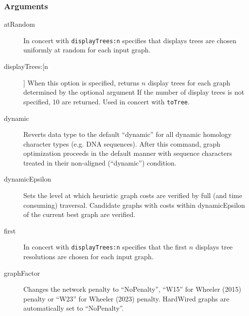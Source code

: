 	\subsubsection{Arguments}
		\begin{description}
			\item[atRandom] In concert with \texttt{displayTrees:n} specifies that displays trees are chosen 
			uniformly at random for each input graph.
			
			
			\item[displayTrees:[n]] When this option is specified, returns $n$ display trees for each graph 
			determined by the optional argument If the number of display trees is not 
			specified, 10 are returned. Used in concert with \texttt{toTree}.
			
			\item[dynamic] Reverts data type to the default ``dynamic'' for all dynamic homology 
			\citep{Wheeler2001} character types (e.g. DNA sequences). After this command, 
			graph optimization proceeds in the default manner with sequence characters treated 
			in their non-aligned (``dynamic'') condition.
			
			\item[dynamicEpsilon] Sets the level at which heuristic graph costs are verified by full (and time consuming) traversal.  
			Candidate graphs with costs within dynamicEpsilon of the current best graph are verified.
			
			\item[first] In concert with \texttt{displayTrees:n} specifies that the first $n$ displays tree 
			resolutions are chosen for each input graph.
			
			\item[graphFactor] Changes the network penalty to ``NoPenalty'', ``W15'' for Wheeler (2015) penalty or
			``W23'' for Wheeler (2023) penalty.  HardWired graphs are automatically set to ``NoPenalty''.
			

\end{description}
